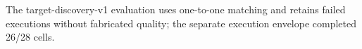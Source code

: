 \documentclass[conference]{IEEEtran}
\begin{document}
The target-discovery-v1 evaluation uses one-to-one matching and retains failed executions without fabricated quality; the separate execution envelope completed 26/28 cells.

\balance


\end{document}
